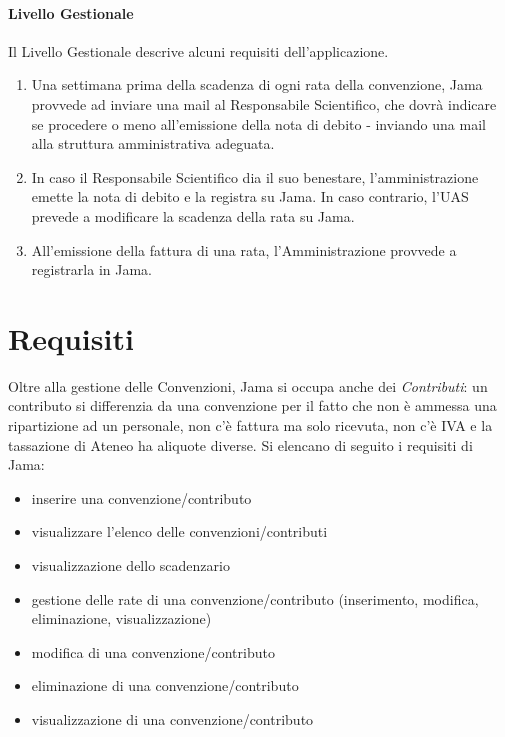 \paragraph{Livello Gestionale}
Il Livello Gestionale descrive alcuni requisiti dell'applicazione.\newline
\begin{enumerate}
\item Una settimana prima della scadenza di ogni rata della convenzione, Jama provvede ad inviare una mail al Responsabile Scientifico, che dovrà indicare se procedere o meno all'emissione della nota di debito - inviando una mail alla struttura amministrativa adeguata.
\item In caso il Responsabile Scientifico dia il suo benestare, l'amministrazione emette la nota di debito e la registra su Jama. In caso contrario, l'UAS prevede a modificare la scadenza della rata su Jama.
\item All'emissione della fattura di una rata, l'Amministrazione provvede a registrarla in Jama.\newline
\end{enumerate}

\section{Requisiti}
Oltre alla gestione delle Convenzioni, Jama si occupa anche dei \textsl{Contributi}: un contributo si differenzia da una convenzione per il fatto che non è ammessa una ripartizione ad un personale, non c'è fattura ma solo ricevuta, non c'è IVA e la tassazione di Ateneo ha aliquote diverse.\newline
Si elencano di seguito i requisiti di Jama:

\begin{itemize}
\item inserire una convenzione/contributo
\item visualizzare l'elenco delle convenzioni/contributi
\item visualizzazione dello scadenzario
\item gestione delle rate di una convenzione/contributo (inserimento, modifica, eliminazione, visualizzazione)
\item modifica di una convenzione/contributo
\item eliminazione di una convenzione/contributo
\item visualizzazione di una convenzione/contributo\newline
\end{itemize}

